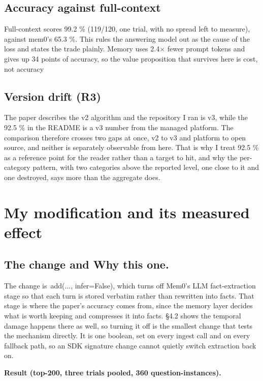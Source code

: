 \documentclass[11pt,a4paper]{article}
\begin{document}
\subsection{Accuracy against full-context}

Full-context scores 99.2 \% (119/120, one trial, with no spread left to measure), against mem0's 65.3 \%. This rules the answering model out as the cause of the loss and states the trade plainly. Memory uses 2.4$\times$ fewer prompt tokens and gives up 34 points of accuracy, so the value proposition that survives here is cost, not accuracy

\subsection{Version drift (R3)}

The paper describes the v2 algorithm and the repository I ran is v3, while the 92.5 \% in the README is a v3 number from the managed platform. The comparison therefore crosses two gaps at once, v2 to v3 and platform to open source, and neither is separately observable from here. That is why I treat 92.5 \% as a reference point for the reader rather than a target to hit, and why the per-category pattern, with two categories above the reported level, one close to it and one destroyed, says more than the aggregate does.

\section{My modification and its measured effect}

\subsection{The change and Why this one.}

The change is~add(..., infer=False), which turns off Mem0's LLM fact-extraction stage so that each turn is stored verbatim rather than rewritten into facts. That stage is where the paper's accuracy comes from, since the memory layer decides what is worth keeping and compresses it into facts. §4.2 shows the temporal damage happens there as well, so turning it off is the smallest change that tests the mechanism directly. It is one boolean, set on every ingest call and on every fallback path, so an SDK signature change cannot quietly switch extraction back on.

\textbf{Result (top-200, three trials pooled, 360 question-instances).}~
\end{document}
